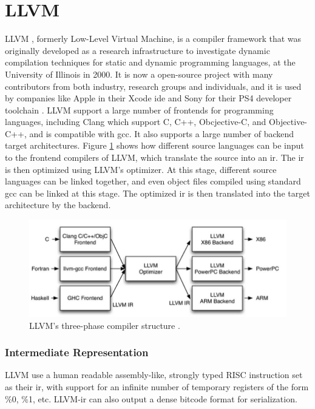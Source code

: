 \section{\label{sec:LLVM}LLVM}
LLVM \cite{LLVM:CGO04}, formerly Low-Level Virtual Machine, is a compiler framework that was originally developed as a research infrastructure to investigate dynamic compilation techniques for static and dynamic programming languages, at the University of Illinois in 2000. It is now a open-source project with many contributors from both industry, research groups and individuals, and it is used by companies like Apple in their Xcode \gls{ide} \cite{llvmapple} and Sony for their PS4 developer toolchain \cite{llvmsony}. LLVM support a large number of frontends for programming languages, including Clang \cite{clang} which support C, C++, Obcjective-C, and Objective-C++, and is compatible with \gls{gcc}. It also supports a large number of backend target architectures. Figure \ref{fig:llvmcompiler} shows how different source languages can be input to the frontend compilers of LLVM, which translate the source into an \gls{ir}. The \gls{ir} is then optimized using LLVM's optimizer. At this stage, different source languages can be linked together, and even object files compiled using standard \gls{gcc} can be linked at this stage. The optimized \gls{ir} is then translated into the target architecture by the backend.

\begin{figure}[hbpt]
\centering
\includegraphics[width=\textwidth]{../figs/LLVMCompiler.jpg}
\caption{\label{fig:llvmcompiler}LLVM's three-phase compiler structure \cite{llvmarch}.}
\end{figure}

\subsubsection{Intermediate Representation}
LLVM use a human readable assembly-like, strongly typed RISC instruction set as their \gls{ir}, with support for an infinite number of temporary registers of the form \%0, \%1, etc. LLVM-\gls{ir} can also output a dense bitcode format for serialization.

